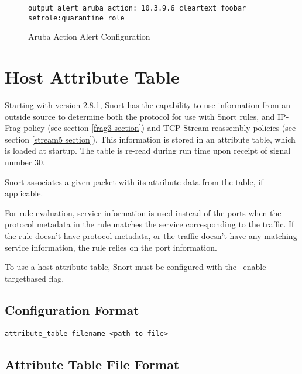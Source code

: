 \documentclass[english]{report}
\newenvironment{note}{
\samepage
    \vspace{10pt}{\textsf{
        {\hspace{7pt}\Huge{$\triangle$\hspace{-12.5pt}{\Large{$^!$}}}}\hspace{5pt}
        {\Large{NOTE}}
    }
    }
   \begin{center}
    \par\vspace{-17pt}

    \begin{lrbox}{\savepar}
    \begin{minipage}[r]{6in}
}
{
    \end{minipage}
    \end{lrbox}
    \fbox{
        \usebox{
            \savepar
	}
    }
    \par\vskip10pt
    \end{center}
}
\newenvironment{note}{
        \begin{rawhtml}
        <p><table border="1"><tr><td><b>
        Note:&nbsp;&nbsp;</b>
        \end{rawhtml}
}{
        \begin{rawhtml}
        </b></td></tr></table></p>
        \end{rawhtml}
}
\begin{document}
\begin{figure}[!hbpt]
\begin{verbatim}
output alert_aruba_action: 10.3.9.6 cleartext foobar setrole:quarantine_role
\end{verbatim}

\caption{\label{aruba_action configuration}Aruba Action Alert Configuration}
\end{figure}

\section{Host Attribute Table \label{targetbased}}

Starting with version 2.8.1, Snort has the capability to use information
from an outside source to determine both the protocol for use with
Snort rules, and IP-Frag policy (see section \ref{frag3 section}) and TCP
Stream reassembly policies (see section \ref{stream5 section}).  This
information is stored in an attribute table, which is loaded at startup.
The table is re-read during run time upon receipt of signal number 30.

Snort associates a given packet with its attribute data from the table,
if applicable.

For rule evaluation, service information is used instead of the ports when
the protocol metadata in the rule matches the service corresponding to the
traffic.  If the rule doesn't have protocol metadata, or the traffic
doesn't have any matching service information, the rule relies on the port
information.

\begin{note}
To use a host attribute table, Snort must be configured with the
--enable-targetbased flag.
\end{note}

\subsection{Configuration Format}

\begin{center}
\begin{verbatim}
attribute_table filename <path to file>
\end{verbatim}
\end{center}

\subsection{Attribute Table File Format}
\end{document}
